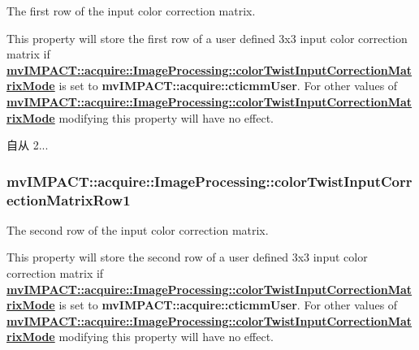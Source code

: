 The first row of the input color correction matrix. 

This property will store the first row of a user defined 3x3 input color correction matrix if {\bfseries \hyperlink{classmv_i_m_p_a_c_t_1_1acquire_1_1_image_processing_a7af8df48fdaec0dd1a1dd6edff1a13cd}{mv\+I\+M\+P\+A\+C\+T\+::acquire\+::\+Image\+Processing\+::color\+Twist\+Input\+Correction\+Matrix\+Mode}} is set to {\bfseries mv\+I\+M\+P\+A\+C\+T\+::acquire\+::cticmm\+User}. For other values of {\bfseries \hyperlink{classmv_i_m_p_a_c_t_1_1acquire_1_1_image_processing_a7af8df48fdaec0dd1a1dd6edff1a13cd}{mv\+I\+M\+P\+A\+C\+T\+::acquire\+::\+Image\+Processing\+::color\+Twist\+Input\+Correction\+Matrix\+Mode}} modifying this property will have no effect.

\begin{DoxySince}{自从}
2... 
\end{DoxySince}
\hypertarget{classmv_i_m_p_a_c_t_1_1acquire_1_1_image_processing_a95c6b003d27034b536a15106c79f2c16}{
\subsubsection[{color\+Twist\+Input\+Correction\+Matrix\+Row1}]{ mv\+I\+M\+P\+A\+C\+T\+::acquire\+::\+Image\+Processing\+::color\+Twist\+Input\+Correction\+Matrix\+Row1}}\label{classmv_i_m_p_a_c_t_1_1acquire_1_1_image_processing_a95c6b003d27034b536a15106c79f2c16}


The second row of the input color correction matrix. 

This property will store the second row of a user defined 3x3 input color correction matrix if {\bfseries \hyperlink{classmv_i_m_p_a_c_t_1_1acquire_1_1_image_processing_a7af8df48fdaec0dd1a1dd6edff1a13cd}{mv\+I\+M\+P\+A\+C\+T\+::acquire\+::\+Image\+Processing\+::color\+Twist\+Input\+Correction\+Matrix\+Mode}} is set to {\bfseries mv\+I\+M\+P\+A\+C\+T\+::acquire\+::cticmm\+User}. For other values of {\bfseries \hyperlink{classmv_i_m_p_a_c_t_1_1acquire_1_1_image_processing_a7af8df48fdaec0dd1a1dd6edff1a13cd}{mv\+I\+M\+P\+A\+C\+T\+::acquire\+::\+Image\+Processing\+::color\+Twist\+Input\+Correction\+Matrix\+Mode}} modifying this property will have no effect.

